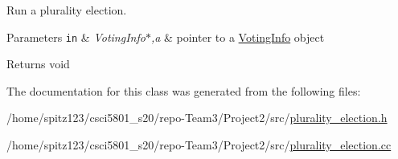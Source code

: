 Run a plurality election. 


\begin{DoxyParams}[1]{Parameters}
\mbox{\tt in}  & {\em Voting\+Info$\ast$,a} & pointer to a \hyperlink{classVotingInfo}{Voting\+Info} object \\
\hline
\end{DoxyParams}
\begin{DoxyReturn}{Returns}
void 
\end{DoxyReturn}


The documentation for this class was generated from the following files\+:\begin{DoxyCompactItemize}
\item 
/home/spitz123/csci5801\+\_\+s20/repo-\/\+Team3/\+Project2/src/\hyperlink{plurality__election_8h}{plurality\+\_\+election.\+h}\item 
/home/spitz123/csci5801\+\_\+s20/repo-\/\+Team3/\+Project2/src/\hyperlink{plurality__election_8cc}{plurality\+\_\+election.\+cc}\end{DoxyCompactItemize}
